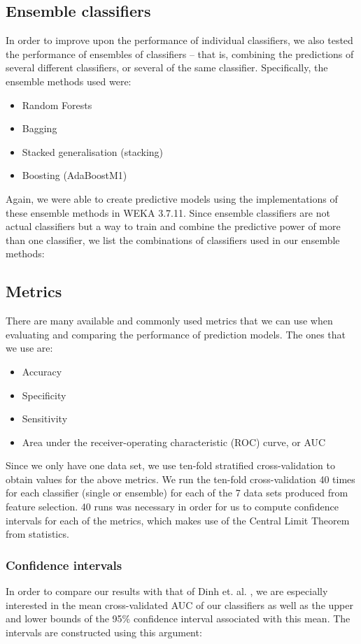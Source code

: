 \subsection{Ensemble classifiers}
In order to improve upon the performance of individual classifiers, we also
tested the performance of ensembles of classifiers -- that is, combining the
predictions of several different classifiers, or several of the same
classifier. Specifically, the ensemble methods used were:
\begin{itemize}
  \item Random Forests
  \item Bagging
  \item Stacked generalisation (stacking)
  \item Boosting (AdaBoostM1)
\end{itemize}

Again, we were able to create predictive models using the implementations of
these ensemble methods in WEKA 3.7.11. Since ensemble classifiers are not
actual classifiers but a way to train and combine the predictive power of more
than one classifier, we list the combinations of classifiers used in our
ensemble methods:

\subsection{Metrics}
There are many available and commonly used metrics that we can use when
evaluating and comparing the performance of prediction models. The ones that
we use are: 
\begin{itemize}
  \item Accuracy
  \item Specificity
  \item Sensitivity
  \item Area under the receiver-operating characteristic (ROC) curve, or AUC
\end{itemize}

Since we only have one data set, we use ten-fold stratified cross-validation
to obtain values for the above metrics. We run the ten-fold cross-validation
40 times for each classifier (single or ensemble) for each of the 7 data sets
produced from feature selection. 40 runs was necessary in order for us to
compute confidence intervals for each of the metrics, which makes use of the
Central Limit Theorem from statistics.

\subsubsection{Confidence intervals}
In order to compare our results with that of Dinh et. al. \citep{Dinh2013a},
we are especially interested in the mean cross-validated AUC of our
classifiers as well as
the upper and lower bounds of the 95\% confidence interval associated with this
mean. The intervals are constructed using this argument:

